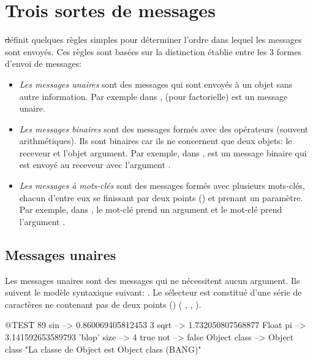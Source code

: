 \documentclass[a4paper,10pt,twoside]{book}
\begin{document}
\section{Trois sortes de messages}

\st d\'efinit quelques r\`egles simples pour d\'eterminer l'ordre dans lequel les messages sont envoy\'es. Ces r\`egles sont bas\'ees sur la distinction \'etablie entre les 3 formes d'envoi de messages: 
\begin{itemize}
\item \emph{Les messages unaires} sont des messages qui sont envoy\'es
  \`a un objet sans autre information. Par exemple dans ,  (pour factorielle) est un message unaire. 
\item  \emph{Les messages binaires} sont des messages form\'es avec
  des op\'erateurs (souvent arithm\'etiques). Ils sont binaires car
  ils ne concernent que deux objets: le receveur et l'objet
  argument. Par exemple, dans , \ct{+} est un message
  binaire qui est envoy\'e au receveur  avec l'argument . 
\item  \emph{Les messages \`a mots-cl\'es} sont des messages form\'es avec plusieurs mots-cl\'es, chacun d'entre eux se finissant par deux points (\ct{:}) et prenant un param\`etre.
Par exemple, dans , le mot-cl\'e 
prend un argument  et le mot-cl\'e  prend l'argument .
\end{itemize}

\subsection{Messages unaires}
Les messages unaires sont des messages qui ne n\'ecessitent aucun
argument. Ils suivent le mod\`ele syntaxique suivant: . Le s\'electeur est constitu\'e d'une s\'erie de
caract\`eres ne contenant pas de deux points (\ct{:}) (\eg
{}, , ).
\begin{code}{@TEST}
89 sin           --> 0.860069405812453
3 sqrt           --> 1.732050807568877
Float pi         --> 3.141592653589793
'blop' size     --> 4
true not        --> false
Object class --> Object class  "La classe de Object est Object class (BANG)"
\end{code}
\end{document}
